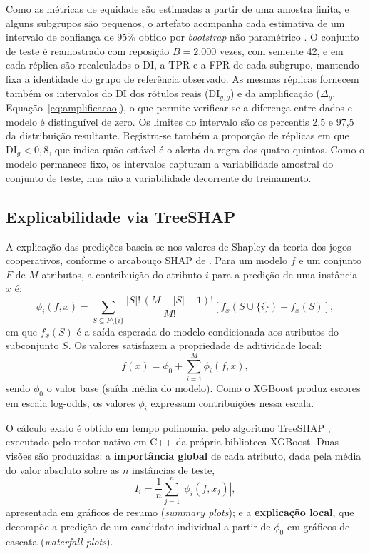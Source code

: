 Como as métricas de equidade são estimadas a partir de uma amostra finita, e alguns subgrupos são pequenos, o artefato acompanha cada estimativa de um intervalo de confiança de 95\% obtido por \textit{bootstrap} não paramétrico \cite{efron1993bootstrap}. O conjunto de teste é reamostrado com reposição $B = 2.000$ vezes, com semente 42, e em cada réplica são recalculados o DI, a TPR e a FPR de cada subgrupo, mantendo fixa a identidade do grupo de referência observado. As mesmas réplicas fornecem também os intervalos do DI dos rótulos reais ($\mathrm{DI}_{y,g}$) e da amplificação ($\Delta_g$, Equação~\eqref{eq:amplificacao}), o que permite verificar se a diferença entre dados e modelo é distinguível de zero. Os limites do intervalo são os percentis 2,5 e 97,5 da distribuição resultante. Registra-se também a proporção de réplicas em que $\mathrm{DI}_g < 0{,}8$, que indica quão estável é o alerta da regra dos quatro quintos. Como o modelo permanece fixo, os intervalos capturam a variabilidade amostral do conjunto de teste, mas não a variabilidade decorrente do treinamento.

\subsection{Explicabilidade via TreeSHAP}

A explicação das predições baseia-se nos valores de Shapley da teoria dos jogos cooperativos, conforme o arcabouço SHAP de . Para um modelo $f$ e um conjunto $F$ de $M$ atributos, a contribuição do atributo $i$ para a predição de uma instância $x$ é:
\begin{equation}
\phi_i(f, x) = \sum_{S \subseteq F \setminus \{i\}} \frac{|S|!\,(M - |S| - 1)!}{M!} \left[ f_x(S \cup \{i\}) - f_x(S) \right],
\label{eq:shapley}
\end{equation}
em que $f_x(S)$ é a saída esperada do modelo condicionada aos atributos do subconjunto $S$. Os valores satisfazem a propriedade de aditividade local:
\begin{equation}
f(x) = \phi_0 + \sum_{i=1}^{M} \phi_i(f, x),
\label{eq:aditividade}
\end{equation}
sendo $\phi_0$ o valor base (saída média do modelo). Como o XGBoost produz escores em escala log-odds, os valores $\phi_i$ expressam contribuições nessa escala.

O cálculo exato é obtido em tempo polinomial pelo algoritmo TreeSHAP \cite{lundberg2020local}, executado pelo motor nativo em C++ da própria biblioteca XGBoost. Duas visões são produzidas: a \textbf{importância global} de cada atributo, dada pela média do valor absoluto sobre as $n$ instâncias de teste,
\begin{equation}
I_i = \frac{1}{n}\sum_{j=1}^{n} \left| \phi_i(f, x_j) \right|,
\label{eq:importancia}
\end{equation}
apresentada em gráficos de resumo (\textit{summary plots}); e a \textbf{explicação local}, que decompõe a predição de um candidato individual a partir de $\phi_0$ em gráficos de cascata (\textit{waterfall plots}).

